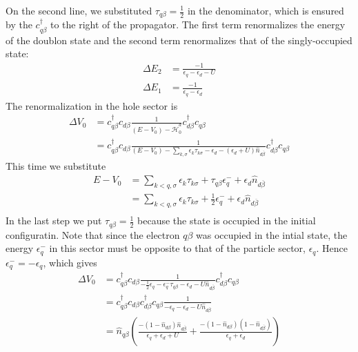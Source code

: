 \documentclass[twoside]{report}
\numberwithin{equation}{section}
\begin{document}
On the second line, we substituted \(\tau_{q\beta} = \frac{1}{2}\) in the denominator, which is ensured by the \(c^\dagger_{q\beta}\) to the right of the propagator. The first term renormalizes the energy of the doublon state and the second term renormalizes that of the singly-occupied state:
\begin{equation}\begin{aligned}
\Delta E_2 &= \frac{-1}{\epsilon_q - \epsilon_d - U}\\
\Delta E_1 &= \frac{-1}{\epsilon_q - \epsilon_d}
\end{aligned}\end{equation}
The renormalization in the hole sector is
\begin{equation}\begin{aligned}
	\Delta V_0 &=  c^\dagger_{q\beta}c_{d\beta}\frac{1}{\left(E - V_0\right) - \hat {\mathcal{H}}^d_0}c^\dagger_{d\beta}c_{q\beta}\\
		   &=  c^\dagger_{q\beta}c_{d\beta}\frac{1}{\left(E - V_0\right) - \sum_{k,\sigma}\epsilon_k\tau_{k\sigma} - \epsilon_d - \left(\epsilon_d + U\right)\hat n_{d\overline\beta}}c^\dagger_{d\beta}c_{q\beta}
\end{aligned}\end{equation}
This time we substitute
\begin{equation}\begin{aligned}
E - V_0 &= \sum_{k<q,\sigma}\epsilon_k \tau_{k\sigma} + \tau_{q\beta} \epsilon^-_q + \epsilon_d\hat n_{d\overline\beta}\\
&= \sum_{k<q,\sigma}\epsilon_k \tau_{k\sigma} + \frac{1}{2} \epsilon^-_q + \epsilon_d\hat n_{d\overline\beta}\\
\end{aligned}\end{equation}
In the last step we put \(\tau_{q\beta}=\frac{1}{2}\) because the state is occupied in the initial configuratin. Note that since the electron \(q\beta\) was occupied in the intial state, the energy \(\epsilon^-_q\) in this sector must be opposite to that of the particle sector, \(\epsilon_q\). Hence \(\epsilon^-_q = -\epsilon_q\), which gives
\begin{equation}\begin{aligned}
\Delta V_0 & = c^\dagger_{q\beta}c_{d\beta}\frac{1}{-\frac{1}{2} \epsilon_q -\epsilon^-_q\tau_{q\beta} - \epsilon_d - U\hat n_{d\overline\beta}}c^\dagger_{d\beta}c_{q\beta}\\
& = c^\dagger_{q\beta}c_{d\beta}c^\dagger_{d\beta}c_{q\beta}\frac{1}{-\epsilon_q - \epsilon_d - U\hat n_{d\overline\beta}}\\
& = \hat n_{q\beta}\left(\frac{-\left(1 - \hat n_{d\beta}\right)\hat n_{d\overline\beta}}{\epsilon_q + \epsilon_d + U} + \frac{-\left(1 - \hat n_{d\beta}\right)\left(1 - \hat n_{d\overline\beta}\right)}{\epsilon_q + \epsilon_d}\right)\\
\end{aligned}\end{equation}
\end{document}
